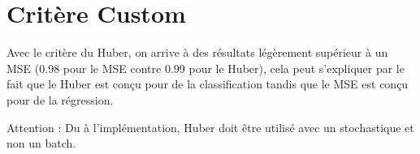 \documentclass[a4paper]{article}
\begin{document}
\section{Critère Custom}

Avec le critère du Huber, on arrive à des résultats légèrement supérieur à un MSE (0.98 pour le MSE contre 0.99 pour le Huber), cela peut s'expliquer par le fait que le Huber est conçu pour de la classification tandis que le MSE est conçu pour de la régression.

Attention : Du à l'implémentation, Huber doit être utilisé avec un stochastique et non un batch.
\end{document}
